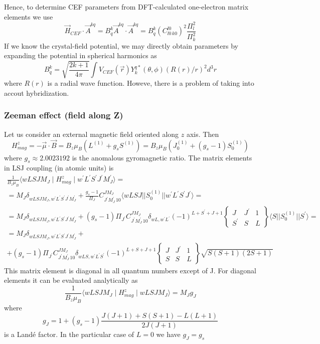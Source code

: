 \documentclass[a4paper,oneside,12pt]{extarticle}
\begin{document}
Hence, to determine CEF parameters from DFT-calculated one-electron matrix elements we use
$$
\vec{H}_{CEF}\cdot \vec{A}^{kq} = B_q^k \vec{A}^{kq}\cdot \vec{A}^{kq} = 
B_q^k \left(C_{l 0 \, k 0}^{l 0}\right)^2 \frac{\Pi^2_l}{\Pi^2_k}
$$
%
If we know the crystal-field potential, we may directly obtain parameters by expanding the potential in spherical harmonics as
%
$$
B_q^k = \sqrt{\frac{2k+1}{4\pi}} \int V_{CEF}(\vec{r}) Y_k^{q*}(\theta,\phi) (R(r)/r)^2 d^3r
$$
where $R(r)$ is a radial wave function. Howeve, there is a problem of taking into accout hybridization.
%

\subsubsection {Zeeman effect (field along Z)}
\label{ssec:Mag}
%
Let us consider an external magnetic field oriented along $z$ axis. Then
%
$$
H_{mag}^z = -\vec{\mu} \cdot \vec{B} = B_z \mu_B (L^{(1)} + g_s S^{(1)}) = B_z \mu_B (J_0^{(1)} + (g_s-1)S_0^{(1)})
$$
where $g_s\approx 2.0023192$ is the anomalous gyromagnetic ratio. The matrix elements in LSJ coupling (in atomic units) is
%
\begin{multline}
\frac{1}{B_z\mu_B} \langle wLSJM_J \mid H_{mag}^z \mid w^{\prime}L^{\prime}S^{\prime}J^{\prime}M_J^{\prime} \rangle =\\=
M_J \delta_{wLSJM_J,w^{\prime}L^{\prime}S^{\prime}J^{\prime}M_J^{\prime}} +
\frac{g_s-1}{\Pi_J} C_{J^{\prime}M_J^{\prime}\, 10}^{JM_J}
\langle wLSJ || S_0^{(1)} || w^{\prime}L^{\prime}S^{\prime}J^{\prime} \rangle = \\ =
M_J \delta_{wLSJM_J,w^{\prime}L^{\prime}S^{\prime}J^{\prime}M_J^{\prime}} +
(g_s-1)\Pi_{J^{\prime}} C_{J^{\prime}M_J^{\prime}\, 10}^{JM_J}
\delta_{wL, w^{\prime}L^{\prime}}
(-1)^{L+S^{\prime}+J+1}
\left \{
\begin{array}{ccc}
J & J^{\prime} & 1 \\
S^{\prime} & S & L
\end{array}
\right \}
\langle S || S_0^{(1)} || S^{\prime} \rangle =\\=
M_J \delta_{wLSJM_J,w^{\prime}L^{\prime}S^{\prime}J^{\prime}M_J^{\prime}} + \\ +
(g_s-1)\Pi_{J^{\prime}} C_{J^{\prime}M_J^{\prime}\, 10}^{JM_J}
\delta_{wLS, w^{\prime}L^{\prime}S^{\prime}}
(-1)^{L+S+J+1}
\left \{
\begin{array}{ccc}
J & J^{\prime} & 1 \\
S & S & L
\end{array}
\right \}
\sqrt{S(S+1)(2S+1)}
\end{multline}
%
This matrix element is diagonal in all quantum numbers except of J. For diagonal elements it can be evaluated analytically as
%
$$
\frac{1}{B_z\mu_B} \langle wLSJM_J \mid H_{mag}^z \mid wLSJM_J \rangle =
M_J g_J
$$
where
$$
g_J = 1 + (g_s-1)\frac{J(J+1)+S(S+1)-L(L+1)}{2J(J+1)}
$$
%
is a Land\'e factor. In the particular case of $L=0$ we have $g_J=g_s$
\end{document}
